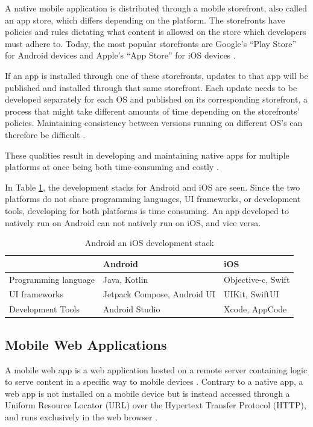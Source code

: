 \documentclass[a4paper,12pt]{article}
\begin{document}
A native mobile application is distributed through a mobile storefront, also called an app store, which differs depending on the platform. The storefronts have policies and rules dictating what content is allowed on the store which developers must adhere to. Today, the most popular storefronts are  Google’s “Play Store” for Android devices and Apple’s “App Store” for iOS devices \cite{numofapps_in_stores}.

If an app is installed through one of these storefronts, updates to that app will be published and installed through that same storefront. Each update needs to be developed separately for each OS and published on its corresponding storefront, a process that might take different amounts of time depending on the storefronts’ policies. Maintaining consistency between versions running on different OS’s can therefore be difficult \cite{comp_mobile_apps_crossplatform}.

These qualities result in developing and maintaining native apps for multiple platforms at once being both time-consuming and costly \cite{mobile_web_apps_2013}.

In Table \ref{tab:devstack}, the development stacks for Android and iOS are seen. Since the two platforms do not share programming languages, UI frameworks, or development tools, developing for both platforms is time consuming. An app developed to natively run on Android can not natively run on iOS, and vice versa.

\begin{table}[h]
\centering
{}
\begin{tabular}{|l|l|l|}
\hline
\rowcolor[HTML]{656565}
\multicolumn{1}{|c|}{\cellcolor[HTML]{656565}} & {\color[HTML]{FFFFFF} Android} & {\color[HTML]{FFFFFF} iOS} \\ \hline
Programming language & Java, Kotlin & Objective-c, Swift \\
UI frameworks & Jetpack Compose, Android UI & UIKit, SwiftUI \\
Development Tools & Android Studio & Xcode, AppCode \\ \hline
\end{tabular}
\caption{Android an iOS development stack \cite{mobile_tech_stacks}}
\label{tab:devstack}
\end{table}

\subsection{Mobile Web Applications}
\label{Theory_mobileWebApps}
A mobile web app is a web application hosted on a remote server containing logic to serve content in a specific way to mobile devices \cite{crossplatform_2012, mobile_web_apps_2013}. Contrary to a native app, a web app is not installed on a mobile device but is instead accessed through a Uniform Resource Locator (URL) over the Hypertext Transfer Protocol (HTTP), and runs exclusively in the web browser \cite{crossplatform_taxonomy, crossplatform_2012}.
\end{document}
